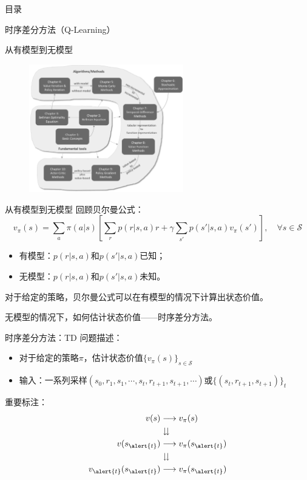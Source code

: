 \begin{frame}{目录}
    \tableofcontents
\end{frame}

\begin{section}{时序差分方法\alert{（Q-Learning）}}

\begin{frame}{从有模型到无模型}
    \begin{figure}
        \centering
        \includegraphics[width=0.6\textwidth]{assets/Figure_chapterMap.png}
    \end{figure}
\end{frame}

\begin{frame}{从有模型到无模型}
    回顾贝尔曼公式：
    \[
        v_\pi(s)=\sum_a\pi(a|s)\left[\sum_r p(r|s,a)r+\gamma\sum_{s'}p(s'|s,a)v_{\pi}(s')\right], \quad \forall s\in\mathcal{S}
    \]
    \begin{itemize}
        \item 有模型：$p(r|s,a)$和$p(s'|s,a)$已知；
        \item 无模型：$p(r|s,a)$和$p(s'|s,a)$未知。
    \end{itemize}
    对于给定的策略，贝尔曼公式可以在有模型的情况下计算出状态价值。

    无模型的情况下，如何估计状态价值——\alert{时序差分方法}。

\end{frame}

\begin{frame}{时序差分方法：TD}
    问题描述：
    \begin{itemize}
        \item 对于给定的策略$\pi$，估计状态价值$\{v_\pi(s)\}_{s\in \mathcal{S}}$
        \item 输入：一系列采样\alert{$(s_0, r_1, s_1,\cdots,s_t,r_{t+1},s_{t+1},\cdots)$}或$\{(s_t,r_{t+1},s_{t+1})\}_t$
    \end{itemize}
    重要标注：
    \[
        \begin{aligned}
            v(s)&\longrightarrow v_\pi(s) \\
            &\downdownarrows \\
            v(s_{\alert{t}})&\longrightarrow v_\pi(s_{\alert{t}}) \\
            &\downdownarrows \\
            v_{\alert{t}}(s_{\alert{t}}) &\longrightarrow v_\pi(s_{\alert{t}})
        \end{aligned}
    \]  
\end{frame}


\end{section}
